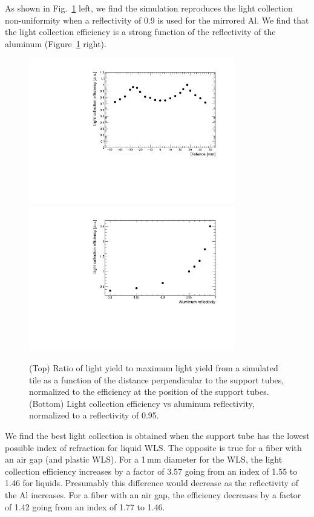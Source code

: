 \documentclass[review]{elsarticle}
\begin{document}
As shown in Fig.~\ref{fig:simeff} left, we find the simulation
reproduces the light collection non-uniformity when a reflectivity of
0.9 is used for the mirrored Al.
We find that the light collection efficiency is a strong function of
the reflectivity of the aluminum (Figure~\ref{fig:simeff} right).


\begin{figure}[!ht]
\begin{center}
\includegraphics[width=0.8\textwidth]{./figures/geant_uniformity_plot.pdf}
\includegraphics[width=0.8\textwidth]{./figures/geant_reflectivity_plot.pdf}
\caption{(Top) Ratio of light yield to maximum light yield from a
  simulated tile as a function of the distance perpendicular to the
  support tubes, normalized to the efficiency at the position of the
  support tubes. (Bottom) Light collection efficiency vs aluminum
  reflectivity, normalized to a reflectivity of 0.95.  }
\label{fig:simeff}
\end{center}
\end{figure}


We find the best light collection is obtained when the support tube has the
lowest possible index of refraction for liquid WLS. The opposite is
true for a fiber with an air gap (and plastic WLS). For a 1\,mm
diameter for the WLS, the light collection efficiency increases by a
factor of 3.57 going from an
index of 1.55 to 1.46 for liquids. Presumably this difference would
decrease as the reflectivity of the Al increases. For a fiber with an
air gap, the efficiency decreases by a factor of 1.42 going from an index of 1.77 to 1.46.
\end{document}

